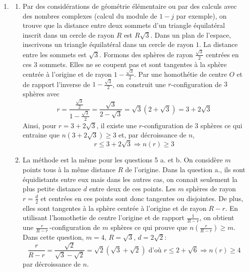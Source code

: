 \begin{enumerate}
 \item
\begin{enumerate}
 \item Par des considérations de géométrie élémentaire ou par des calculs avec des nombres complexes (calcul du module de $1-j$ par exemple), on trouve que la distance entre deux sommets d'un triangle équilatéral inscrit dans un cercle de rayon $R$ est $R\sqrt{3}$.\newline
Dans un plan de l'espace, inscrivons un triangle équilatéral dans un cercle de rayon $1$. La distance entre les sommets est $\sqrt{3}$. Formons des sphères de rayon $\frac{\sqrt{3}}{2}$ centrées en ces $3$ sommets. Elles ne se coupent pas et sont tangentes à la sphère centrée à l'origine et de rayon $1-\frac{\sqrt{3}}{2}$.  Par une homothétie de centre $O$ et de rapport l'inverse de $1-\frac{\sqrt{3}}{2}$, on construit une $r$-configuration de $3$ sphères avec
\begin{displaymath}
 r = \frac{\frac{\sqrt{3}}{2}}{1-\frac{\sqrt{3}}{2}}
= \frac{\sqrt{3}}{2-\sqrt{3}}= \sqrt{3}(2+\sqrt{3}) = 3+2\sqrt{3}
\end{displaymath}
Ainsi, pour $r=3+2\sqrt{3}$, il existe une $r$-configuration de $3$ sphères ce qui entraine que $n(3+2\sqrt{3})\geq3$ et, par décroissance de $n$,
\begin{displaymath}
 r\leq 3+2\sqrt{3} \Rightarrow n(r) \geq 3
\end{displaymath}

 \item La méthode est la même pour les questions 5 a. et b. On considère $m$ points tous à la même distance $R$ de l'origine. Dans la question a., ils sont équidistants entre eux mais dans les autres cas, on connait seulement la plus petite distance $d$ entre deux de ces points. Les $m$ sphères de rayon $r=\frac{d}{2}$ et centrées en ces points  sont donc tangentes ou disjointes. De plus, elles sont tangentes à la sphère centrée à l'origine et de rayon $R-r$. En utilisant l'homothetie de centre l'origine et de rapport $\frac{1}{R-r}$, on obtient une $\frac{r}{R-r}$\,-configuration de $m$ sphères ce qui prouve que $n(\frac{r}{R-r})\geq m$.\newline
Dans cette question, $m=4$, $R=\sqrt{3}$, $d=2\sqrt{2}$:
\begin{displaymath}
 \frac{r}{R-r}=\frac{\sqrt{2}}{\sqrt{3}-\sqrt{2}}=\sqrt{2}(\sqrt{3}+\sqrt{2})
\text{ d'où }
r\leq 2+\sqrt{6} \Rightarrow n(r) \geq 4
\end{displaymath}
par décroissance de $n$.


\end{enumerate}
\end{enumerate}
